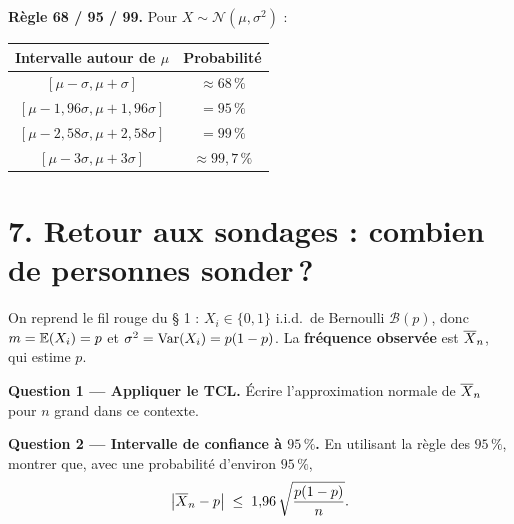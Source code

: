 \medskip

\textbf{Règle 68 / 95 / 99.}
Pour $X\sim\mathcal{N}(\mu,\sigma^2)$ :
\begin{center}
\renewcommand{\arraystretch}{1.3}
\begin{tabular}{|c|c|}
  \hline
  Intervalle autour de $\mu$ & Probabilité \\
  \hline
  $[\mu-\sigma,\mu+\sigma]$ & $\approx 68\,\%$ \\
  \hline
  $[\mu-1{,}96\sigma,\mu+1{,}96\sigma]$ & $=95\,\%$ \\
  \hline
  $[\mu-2{,}58\sigma,\mu+2{,}58\sigma]$ & $=99\,\%$ \\
  \hline
  $[\mu-3\sigma,\mu+3\sigma]$ & $\approx 99{,}7\,\%$ \\
  \hline
\end{tabular}
\end{center}

\section*{7. Retour aux sondages : combien de personnes sonder\,?}

On reprend le fil rouge du § 1 : $X_i\in\{0,1\}$ i.i.d.\
de Bernoulli $\mathcal{B}(p)$, donc
$m=\mathbb{E}(X_i)=p$ et $\sigma^2=\operatorname{Var}(X_i)=p(1-p)$.
La \textbf{fréquence observée} est $\overline{X}_n$, qui estime $p$.

\medskip

\textbf{Question 1 --- Appliquer le TCL.}
Écrire l'approximation normale de $\overline{X}_n$ pour $n$ grand dans ce
contexte.


\textbf{Question 2 --- Intervalle de confiance à $95\,\%$.}
En utilisant la règle des $95\,\%$, montrer que, avec une
probabilité d'environ $95\,\%$,
\[
  \bigl|\overline{X}_n-p\bigr|\;\le\; 1{,}96\,\sqrt{\dfrac{p(1-p)}{n}}.
\]


\medskip

